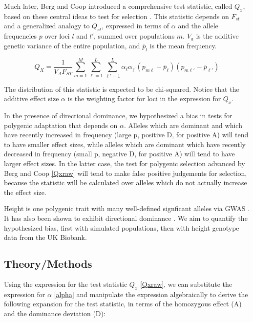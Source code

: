 \documentclass[a4paper,12pt]{article}
\begin{document}
Much later, Berg and Coop introduced a comprehensive test statistic,
called $Q_x$, based on these central ideas to test
for selection \cite{berg}. This statistic depends on $F_{st}$ and
a generalized analogy to $Q_{st}$, expressed in terms of $\alpha$ and
the allele frequencies $p$ over loci $l$ and $l'$, summed over
populations $m$. $V_a$ is the additive genetic variance of the entire
population, and $\overline{p}_l$ is the mean frequency.

\begin{equation} \label{Qxraw}
  Q_X = \frac{1}{V_A F_{ST}} \sum_{m=1}^M \sum_{\ell=1}^L \sum_{\ell\prime=1}^L \alpha_{\ell} \alpha_{\ell^{\prime}}\left(p_{m\ell} - \overline{p}_\ell \right)\left(p_{m \ell\prime} - \overline{p}_{\ell\prime}\right)
\end{equation}


The distribution of this statistic is expected to be chi-squared. Notice that the additive effect size $\alpha$ is the weighting factor for loci in the
expression for $Q_x$. 

In the presence of directional dominance, we hypothesized a bias in
tests for polygenic adaptation that depends on $\alpha$. Alleles which are dominant and which have recently increased in
frequency (large p, positive D, for positive A) will tend to have smaller effect sizes, while
alleles which are dominant which have recently decreased in frequency
(small p, negative D, for positive A) will tend to have larger effect sizes. In the
latter case, the test for polygenic selection advanced by Berg and Coop
\eqref{Qxraw} will tend to make false positive judgements for
selection, because the statistic will be calculated over alleles which
do not actually increase the effect size.

Height is one polygenic trait with many well-defined signficant
alleles via GWAS \cite{heightselection}. It has also been shown to exhibit
directional dominance \cite{heightdirectdom}. We aim to quantify the
hypothesized bias, first with simulated populations, then with height genotype data from the UK Biobank.



\subsection*{Theory/Methods}

Using the expression for the test statistic $Q_x$ \eqref{Qxraw}, we
can substitute the expression for $\alpha$ \eqref{alpha} and manipulate
the expression algebraically to derive the following expansion for the
test statistic, in terms of the homozygous effect (A)  and the dominance
deviation (D):
\end{document}
